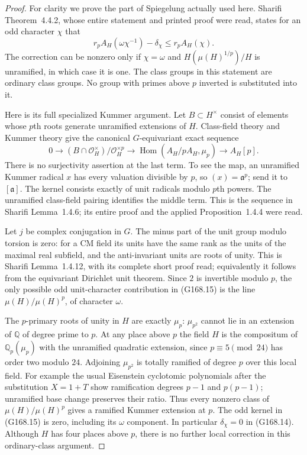 \begin{proof}
For clarity we prove the part of Spiegelung actually used here.
Sharifi Theorem~4.4.2, whose entire statement and printed proof
were read, states for an odd character $\chi$ that
\[
 r_p A_H(\omega\chi^{-1})-\delta_\chi
                              \leq r_p A_H(\chi).
 \tag{G168.14}
\]
The correction can be nonzero only if $\chi=\omega$ and
$H(\mu(H)^{1/p})/H$ is unramified, in which case it is one.
The class groups in this statement are ordinary class groups.
No group with primes above $p$ inverted is substituted into it.

Here is its full specialized Kummer argument.
Let $B\subset H^\times$ consist of elements whose $p$th
roots generate unramified extensions of $H$.
Class-field theory and Kummer theory give the canonical
$G$-equivariant exact sequence
\[
 0\longrightarrow
       (B\cap\mathcal O_H^\times)/\mathcal O_H^{\times p}
 \longrightarrow\operatorname{Hom}(A_H/pA_H,\mu_p)
 \longrightarrow A_H[p].
 \tag{G168.15}
\]
There is no surjectivity assertion at the last term.
To see the map, an unramified Kummer radical $x$ has every
valuation divisible by $p$, so $(x)=\mathfrak a^p$; send it
to $[\mathfrak a]$.
The kernel consists exactly of unit radicals modulo $p$th
powers.  The unramified class-field pairing identifies the
middle term.  This is the sequence in Sharifi Lemma~1.4.6;
its entire proof and the applied Proposition~1.4.4 were read.

Let $j$ be complex conjugation in $G$.
The minus part of the unit group modulo torsion is zero:
for a CM field its units have the same rank as the units of
the maximal real subfield, and the anti-invariant units are
roots of unity.  This is Sharifi Lemma~1.4.12, with its complete
short proof read; equivalently it follows from the
equivariant Dirichlet unit theorem.
Since $2$ is invertible modulo $p$, the only possible odd
unit-character contribution in (G168.15) is the line
$\mu(H)/\mu(H)^p$, of character $\omega$.

The $p$-primary roots of unity in $H$ are exactly $\mu_p$:
$\mu_{p^2}$ cannot lie in an extension of $\mathbb Q$ of
degree prime to $p$.
At any place above $p$ the field $H$ is the compositum of
$\mathbb Q_p(\mu_p)$ with the unramified quadratic extension,
since $p\equiv5\pmod{24}$ has order two modulo $24$.
Adjoining $\mu_{p^2}$ is totally ramified of degree $p$ over
this local field.  For example the usual Eisenstein
cyclotomic polynomials after the substitution $X=1+T$ show
ramification degrees $p-1$ and $p(p-1)$; unramified base
change preserves their ratio.
Thus every nonzero class of $\mu(H)/\mu(H)^p$ gives a
ramified Kummer extension at $p$.
The odd kernel in (G168.15) is zero, including its
$\omega$ component.  In particular $\delta_\chi=0$ in
(G168.14).
Although $H$ has four places above $p$, there is no further
local correction in this ordinary-class argument.


\end{proof}

